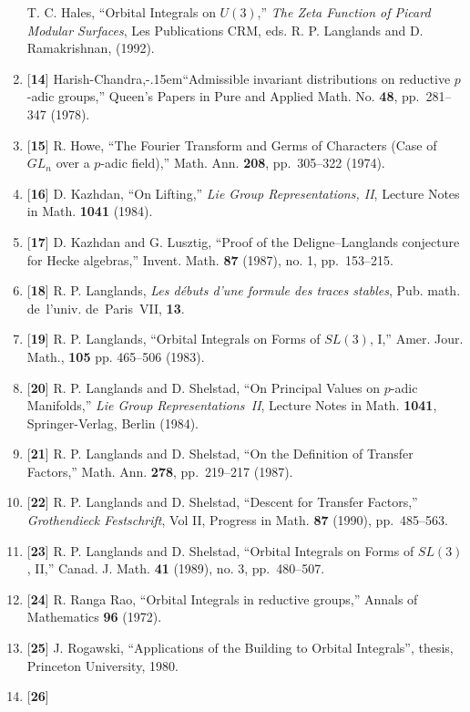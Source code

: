 \documentclass{amsart}
\begin{document}
\begin{enumerate}[label=]
  T. C. Hales,
  ``Orbital Integrals on $U(3)$,''
  {\sl The Zeta Function of Picard Modular Surfaces},
  Les Publications CRM, eds. R. P. Langlands and
  D. Ramakrishnan, (1992).
%
\item{[{\bf 14}]}
  Harish-Chandra\hbox{,\kern-.15em``}Admissible invariant distributions on reductive $p$-adic 
    groups,''
  Queen's Papers in Pure and Applied Math. No. {\bf 48}, pp.~281--347
  (1978).
%
\item{[{\bf 15}]}
  R. Howe,
  ``The Fourier Transform and Germs of Characters (Case of $GL_n$ 
    over a $p$-adic field),''
  Math. Ann. {\bf 208}, pp.~305--322 (1974).
%
\item{[{\bf 16}]}
  D. Kazhdan,
  ``On Lifting,'' {\sl Lie Group Representations, II},
  Lecture Notes in Math. {\bf 1041} (1984).
%
\item{[{\bf 17}]}
  D. Kazhdan and G. Lusztig,
  ``Proof of the Deligne--Langlands conjecture for Hecke algebras,''
  Invent. Math. {\bf 87} (1987), no. 1, pp.~153--215.
%
\item{[{\bf 18}]}
  R. P. Langlands,
  {\sl Les d\'ebuts d'une formule des traces stables},
  Pub. math. de~l'univ. de~Paris~VII, {\bf 13}.
%
\item{[{\bf 19}]}
  R. P. Langlands,
  ``Orbital Integrals on Forms of $SL(3)$, I,''
  Amer. Jour. Math., {\bf 105} pp. 465--506
  (1983).
%
\item{[{\bf 20}]}
  R. P. Langlands and D. Shelstad,
  ``On Principal Values on $p$-adic Manifolds,''
  {\sl Lie Group Representations~II}, Lecture Notes in Math.
  {\bf 1041}, Springer-Verlag, Berlin (1984).
%
\item{[{\bf 21}]}
  R. P. Langlands and D. Shelstad,
  ``On the Definition of Transfer Factors,''
  Math. Ann. {\bf 278}, pp.~219--217 (1987).
%
\item{[{\bf 22}]}
  R. P. Langlands and D. Shelstad,
  ``Descent for Transfer Factors,''
  {\sl Grothendieck Festschrift}, Vol II,
  Progress in Math. {\bf 87} (1990), pp.~485--563.
%
\item{[{\bf 23}]}
  R. P. Langlands and D. Shelstad,
  ``Orbital Integrals on Forms of $SL(3)$, II,''
  Canad. J. Math. {\bf 41} (1989), no. 3, pp.~480--507.
%  
\item{[{\bf 24}]}
  R. Ranga Rao,
  ``Orbital Integrals in reductive groups,''
  Annals of Mathematics {\bf 96} (1972).
%
\item{[{\bf 25}]}
  J. Rogawski,
  ``Applications of the Building to Orbital Integrals'',
  thesis, Princeton University, 1980.
%
\item{[{\bf 26}]}

\end{enumerate}
\end{document}
